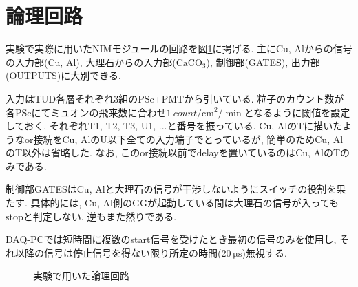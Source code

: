 \documentclass[dvipdfmx]{jsarticle}
\begin{document}
\appendix


\section{論理回路}
\label{sec: logic circuit}

実験で実際に用いたNIMモジュールの回路を図\ref{fig: full circuit}に掲げる.
主にCu, Alからの信号の入力部(Cu, Al), 大理石からの入力部($\mathrm{CaCO_3}$), 制御部(GATES), 出力部(OUTPUTS)に大別できる.

入力はTUD各層それぞれ3組のPSc+PMTから引いている.
粒子のカウント数が各PScにてミュオンの飛来数に合わせ$\SI{1}{count/\cm^2/\min}$となるように閾値を設定しておく\cite{Grupen}.
それぞれT1, T2, T3, U1, ...と番号を振っている.
Cu, AlのTに描いたようなor接続をCu, AlのU以下全ての入力端子でとっているが, 簡単のためCu, AlのT以外は省略した.
なお, このor接続以前でdelayを置いているのはCu, AlのTのみである.

制御部GATESはCu, Alと大理石の信号が干渉しないようにスイッチの役割を果たす.
具体的には, Cu, Al側のGGが起動している間は大理石の信号が入ってもstopと判定しない.
逆もまた然りである.

DAQ-PCでは短時間に複数のstart信号を受けたとき最初の信号のみを使用し, それ以降の信号は停止信号を得ない限り所定の時間($\SI{20}{\micro\second}$)無視する.

\begin{landscape}
    \begin{figure}
        \centering
        
        \caption{実験で用いた論理回路}
        \label{fig: full circuit}
    \end{figure}
\end{landscape}




\end{document}
